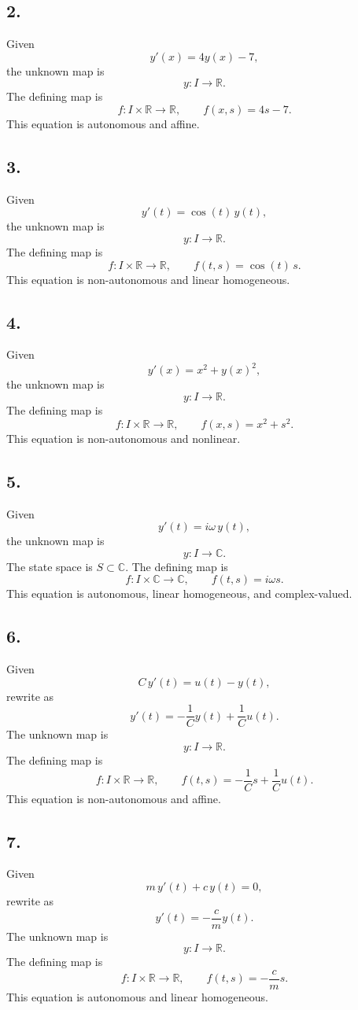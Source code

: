 \documentclass[12pt]{article}
\begin{document}
	\subsection*{2.}
	Given
	$$
	y'(x)=4y(x)-7,
	$$
	the unknown map is
	$$
	y:I\to\mathbb{R}.
	$$
	The defining map is
	$$
	f:I\times\mathbb{R}\to\mathbb{R},
	\qquad
	f(x,s)=4s-7.
	$$
	This equation is autonomous and affine.
	
	\subsection*{3.}
	Given
	$$
	y'(t)=\cos(t)\,y(t),
	$$
	the unknown map is
	$$
	y:I\to\mathbb{R}.
	$$
	The defining map is
	$$
	f:I\times\mathbb{R}\to\mathbb{R},
	\qquad
	f(t,s)=\cos(t)\,s.
	$$
	This equation is non-autonomous and linear homogeneous.
	
	\subsection*{4.}
	Given
	$$
	y'(x)=x^2+y(x)^2,
	$$
	the unknown map is
	$$
	y:I\to\mathbb{R}.
	$$
	The defining map is
	$$
	f:I\times\mathbb{R}\to\mathbb{R},
	\qquad
	f(x,s)=x^2+s^2.
	$$
	This equation is non-autonomous and nonlinear.
	
	\subsection*{5.}
	Given
	$$
	y'(t)=i\omega\,y(t),
	$$
	the unknown map is
	$$
	y:I\to\mathbb{C}.
	$$
	The state space is \(S\subset\mathbb{C}\). The defining map is
	$$
	f:I\times\mathbb{C}\to\mathbb{C},
	\qquad
	f(t,s)=i\omega s.
	$$
	This equation is autonomous, linear homogeneous, and complex-valued.
	
	\subsection*{6.}
	Given
	$$
	C\,y'(t)=u(t)-y(t),
	$$
	rewrite as
	$$
	y'(t)=-\frac{1}{C}y(t)+\frac{1}{C}u(t).
	$$
	The unknown map is
	$$
	y:I\to\mathbb{R}.
	$$
	The defining map is
	$$
	f:I\times\mathbb{R}\to\mathbb{R},
	\qquad
	f(t,s)=-\frac{1}{C}s+\frac{1}{C}u(t).
	$$
	This equation is non-autonomous and affine.
	
	\subsection*{7.}
	Given
	$$
	m\,y'(t)+c\,y(t)=0,
	$$
	rewrite as
	$$
	y'(t)=-\frac{c}{m}y(t).
	$$
	The unknown map is
	$$
	y:I\to\mathbb{R}.
	$$
	The defining map is
	$$
	f:I\times\mathbb{R}\to\mathbb{R},
	\qquad
	f(t,s)=-\frac{c}{m}s.
	$$
	This equation is autonomous and linear homogeneous.
	
\end{document}
